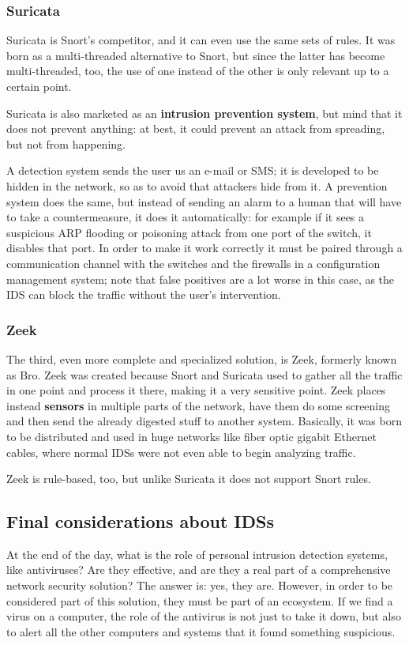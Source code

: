 
\subsubsection*{Suricata}
Suricata is Snort’s competitor, and it can even use the same sets of rules. It was born as a multi-threaded alternative to Snort, but since the latter has become multi-threaded, too, the use of one instead of the other is only relevant up to a certain point.

Suricata is also marketed as an \textbf{intrusion prevention system}, but mind that it does not prevent anything: at best, it could prevent an attack from spreading, but not from happening.
 
A detection system sends the user us an e-mail or SMS; it is developed to be hidden in the network, so as to avoid that attackers hide from it. A prevention system does the same, but instead of sending an alarm to a human that will have to take a countermeasure, it does it automatically: for example if it sees a suspicious ARP flooding or poisoning attack from one port of the switch, it disables that port. In order to make it work correctly it must be paired through a communication channel with the switches and the firewalls in a configuration management system; note that false positives are a lot worse in this case, as the IDS can block the traffic without the user’s intervention.


\subsubsection*{Zeek}
The third, even more complete and specialized solution, is Zeek, formerly known as Bro. Zeek was created because Snort and Suricata used to gather all the traffic in one point and process it there, making it a very sensitive point. Zeek places instead \textbf{sensors} in multiple parts of the network, have them do some screening and then send the already digested stuff to another system. Basically, it was born to be distributed and used in huge networks like fiber optic gigabit Ethernet cables, where normal IDSs were not even able to begin analyzing traffic.

Zeek is rule-based, too, but unlike Suricata it does not support Snort rules.
 

\subsection{Final considerations about IDSs}
At the end of the day, what is the role of personal intrusion detection systems, like antiviruses?
Are they effective, and are they a real part of a comprehensive network security solution? The answer is: yes, they are. However, in order to be considered part of this solution, they must be part of an ecosystem. If we find a virus on a computer, the role of the antivirus is not just to take it down, but also to alert all the other computers and systems that it found something suspicious.

